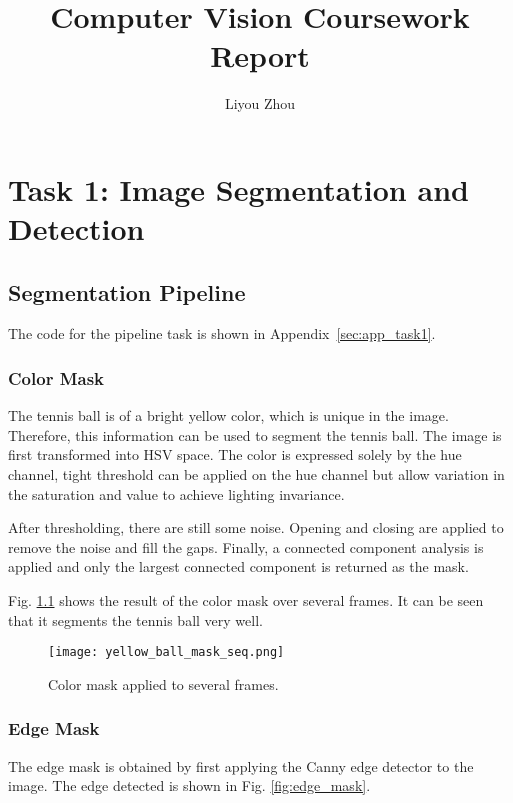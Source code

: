 \documentclass{report}
\title{Computer Vision Coursework Report}
\author{Liyou Zhou}
\begin{document}
\maketitle


\chapter{Task 1: Image Segmentation and Detection}

\section{Segmentation Pipeline}

The code for the pipeline task is shown in Appendix~\ref{sec:app_task1}.

\subsection{Color Mask}

The tennis ball is of a bright yellow color, which is unique in the image. Therefore, this information can be used to segment the tennis ball. The image is first transformed into HSV space. The color is expressed solely by the hue channel, tight threshold can be applied on the hue channel but allow variation in the saturation and value to achieve lighting invariance.

After thresholding, there are still some noise. Opening and closing are applied to remove the noise and fill the gaps. Finally, a connected component analysis is applied and only the largest connected component is returned as the mask.

Fig. \ref{fig:color_mask} shows the result of the color mask over several frames. It can be seen that it segments the tennis ball very well.

\begin{figure}[ht]
    \centering
    \texttt{[image: yellow\_ball\_mask\_seq.png]}
    \caption{Color mask applied to several frames.}
    \label{fig:color_mask}
\end{figure}

\subsection{Edge Mask}

The edge mask is obtained by first applying the Canny edge detector to the image. The edge detected is shown in Fig. \ref{fig:edge_mask}.
\end{document}
